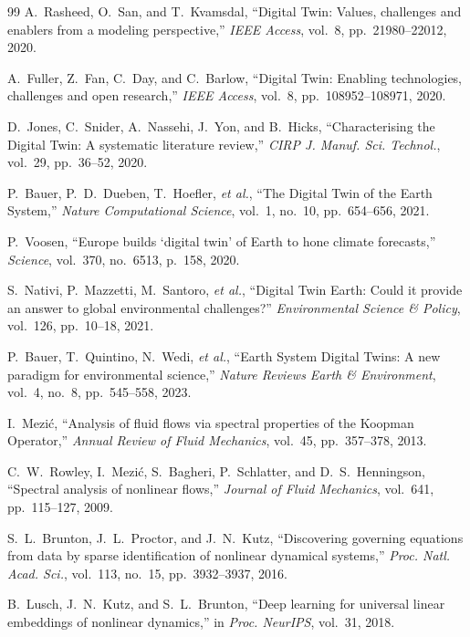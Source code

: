 \documentclass[preprint,times,numbers]{elsarticle}
\begin{document}
\begin{thebibliography}{99}
A.~Rasheed, O.~San, and T.~Kvamsdal, ``Digital Twin: Values, challenges and enablers from a modeling perspective,'' \textit{IEEE Access}, vol.~8, pp.~21980--22012, 2020.

A.~Fuller, Z.~Fan, C.~Day, and C.~Barlow, ``Digital Twin: Enabling technologies, challenges and open research,'' \textit{IEEE Access}, vol.~8, pp.~108952--108971, 2020.

D.~Jones, C.~Snider, A.~Nassehi, J.~Yon, and B.~Hicks, ``Characterising the Digital Twin: A systematic literature review,'' \textit{CIRP J. Manuf. Sci. Technol.}, vol.~29, pp.~36--52, 2020.

P.~Bauer, P.~D.~Dueben, T.~Hoefler, \textit{et al.}, ``The Digital Twin of the Earth System,'' \textit{Nature Computational Science}, vol.~1, no.~10, pp.~654--656, 2021.

P.~Voosen, ``Europe builds `digital twin' of Earth to hone climate forecasts,'' \textit{Science}, vol.~370, no.~6513, p.~158, 2020.

S.~Nativi, P.~Mazzetti, M.~Santoro, \textit{et al.}, ``Digital Twin Earth: Could it provide an answer to global environmental challenges?'' \textit{Environmental Science \& Policy}, vol.~126, pp.~10--18, 2021.

P.~Bauer, T.~Quintino, N.~Wedi, \textit{et al.}, ``Earth System Digital Twins: A new paradigm for environmental science,'' \textit{Nature Reviews Earth \& Environment}, vol.~4, no.~8, pp.~545--558, 2023.

I.~Mezi\'{c}, ``Analysis of fluid flows via spectral properties of the Koopman Operator,'' \textit{Annual Review of Fluid Mechanics}, vol.~45, pp.~357--378, 2013.

C.~W.~Rowley, I.~Mezi\'{c}, S.~Bagheri, P.~Schlatter, and D.~S.~Henningson, ``Spectral analysis of nonlinear flows,'' \textit{Journal of Fluid Mechanics}, vol.~641, pp.~115--127, 2009.

S.~L.~Brunton, J.~L.~Proctor, and J.~N.~Kutz, ``Discovering governing equations from data by sparse identification of nonlinear dynamical systems,'' \textit{Proc. Natl. Acad. Sci.}, vol.~113, no.~15, pp.~3932--3937, 2016.

B.~Lusch, J.~N.~Kutz, and S.~L.~Brunton, ``Deep learning for universal linear embeddings of nonlinear dynamics,'' in \textit{Proc. NeurIPS}, vol.~31, 2018.


\end{thebibliography}
\end{document}
